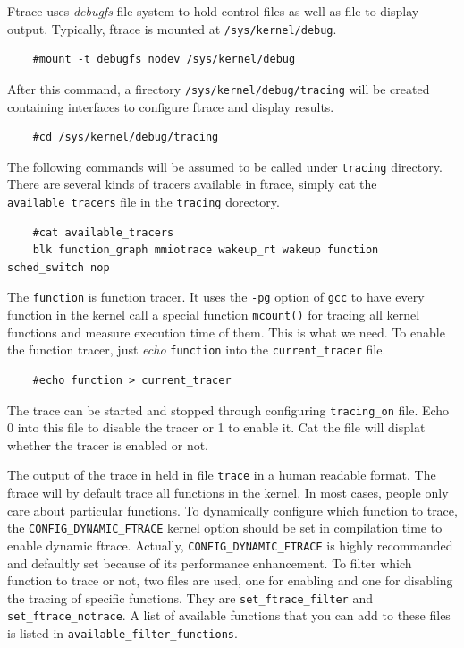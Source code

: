 Ftrace uses \emph{debugfs} file system to hold control files as well as
file to display output. 
Typically, ftrace is mounted at \texttt{/sys/kernel/debug}.
\begin{lstlisting}
	#mount -t debugfs nodev /sys/kernel/debug
\end{lstlisting}
After this command, a firectory \texttt{/sys/kernel/debug/tracing} will 
be created containing interfaces to configure ftrace and display results.
\begin{lstlisting}
	#cd /sys/kernel/debug/tracing
\end{lstlisting}
The following commands will be assumed to be called under \texttt{tracing}
directory.
There are several kinds of tracers available in ftrace, simply cat the
\texttt{available\_tracers} file in the \texttt{tracing} dorectory.
\begin{lstlisting}
	#cat available_tracers
	blk function_graph mmiotrace wakeup_rt wakeup function sched_switch nop
\end{lstlisting}
The \texttt{function} is function tracer. It uses the \texttt{-pg} option
of \texttt{gcc} to have every function in the kernel call a special function
\texttt{mcount()} for tracing all kernel functions and measure execution time 
of them.  This is what we need. To enable the function tracer, just \emph{echo} \texttt{function} into the \texttt{current\_tracer}
file.
\begin{lstlisting}
	#echo function > current_tracer
\end{lstlisting}
The trace can be started and stopped through configuring \texttt{tracing\_on}
file. Echo 0 into this file to disable the tracer or 1 to enable it. Cat the
file will displat whether the tracer is enabled or not.

The output of the trace in held in file \texttt{trace} in a human readable
format. The ftrace will by default trace all functions in the kernel. In
most cases, people only care about particular functions. To dynamically
configure which function to trace, the \texttt{CONFIG\_DYNAMIC\_FTRACE}
kernel option should be set in compilation time  to enable dynamic ftrace. 
Actually, \texttt{CONFIG\_DYNAMIC\_FTRACE} is highly recommanded and defaultly
set because of its performance enhancement. To filter which function to trace
or not, two files are used, one for enabling and one for disabling the 
tracing of specific functions. They are \texttt{set\_ftrace\_filter} and 
\texttt{set\_ftrace\_notrace}. A list of available functions that you can add
to these files is listed in \texttt{available\_filter\_functions}.

